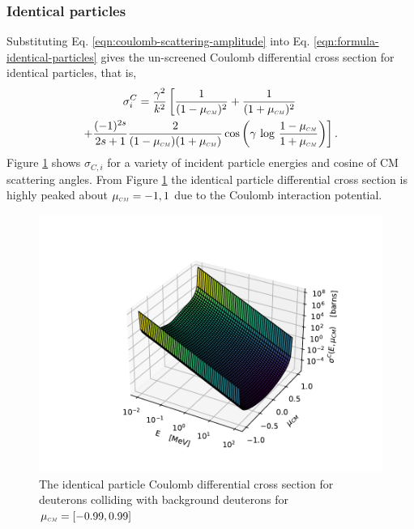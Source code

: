 \subsubsection{Identical particles}
Substituting Eq. \eqref{eqn:coulomb-scattering-amplitude} into Eq. \eqref{eqn:formula-identical-particles} gives the un-screened Coulomb differential cross section for identical particles, that is,
\begin{multline} \label{eqn:coulomb-unscreened-identical}
   \sigma_{i}^{C} = \dfrac{\gamma^2}{k^2} \left[ \dfrac{1}{(1 - \mucm)^2} + \dfrac{1}{(1 + \mucm)^2} \right. \\ \left. + \dfrac{(-1)^{2s}}{2s+1} \dfrac{2}{(1 - \mucm)(1 + \mucm)} \cos \left( \gamma \, \log \, \dfrac{1 - \mucm}{1 + \mucm} \right) \right].
\end{multline}
Figure \ref{fig:coulomb-identical} shows $\sigma_{C,i}$ for a variety of incident particle energies and cosine of CM scattering angles. From Figure \ref{fig:coulomb-identical} the identical particle differential cross section is highly peaked about $\mucm = -1, 1$ due to the Coulomb interaction potential. 
\begin{figure}[!htb]
    \centering
    \includegraphics[]{../figures/interaction_physics/sigma-Ci.pdf}
    \caption{The identical particle Coulomb differential cross section for deuterons colliding with background deuterons for $\mucm = [-0.99,0.99]$}
    \label{fig:coulomb-identical}
\end{figure}

